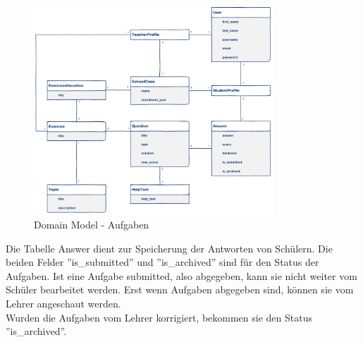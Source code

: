 \begin{figure}[H]
\begin{center}
	\includegraphics[width=0.8\textwidth, keepaspectratio]{images/domain_model_exercise.png}
	\caption{Domain Model - Aufgaben}
	\label{fig:domain_model_exercise}
\end{center}
\end{figure}

Die Tabelle Answer dient zur Speicherung der Antworten von Schülern. Die beiden Felder ''is\_submitted'' und ''is\_archived'' sind für den Status der Aufgaben. Ist eine Aufgabe submitted, also abgegeben, kann sie nicht weiter vom Schüler bearbeitet werden. Erst wenn Aufgaben abgegeben sind, können sie vom Lehrer angeschaut werden. \\ 
Wurden die Aufgaben vom Lehrer korrigiert, bekommen sie den Status ''is\_archived''.

\newpage
